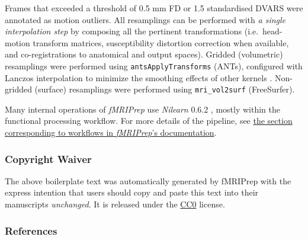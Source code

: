\documentclass[]{article}
\begin{document}
\begin{description}
Frames that exceeded a threshold of 0.5 mm FD or 1.5 standardised DVARS
were annotated as motion outliers. All resamplings can be performed with
\emph{a single interpolation step} by composing all the pertinent
transformations (i.e.~head-motion transform matrices, susceptibility
distortion correction when available, and co-registrations to anatomical
and output spaces). Gridded (volumetric) resamplings were performed
using \texttt{antsApplyTransforms} (ANTs), configured with Lanczos
interpolation to minimize the smoothing effects of other kernels
\citep{lanczos}. Non-gridded (surface) resamplings were performed using
\texttt{mri\_vol2surf} (FreeSurfer).
\end{description}

Many internal operations of \emph{fMRIPrep} use \emph{Nilearn} 0.6.2
\citep[RRID:SCR\_001362]{nilearn}, mostly within the functional
processing workflow. For more details of the pipeline, see
\href{https://fmriprep.readthedocs.io/en/latest/workflows.html}{the
section corresponding to workflows in \emph{fMRIPrep}'s documentation}.

\hypertarget{copyright-waiver}{%
\subsubsection{Copyright Waiver}\label{copyright-waiver}}

The above boilerplate text was automatically generated by fMRIPrep with
the express intention that users should copy and paste this text into
their manuscripts \emph{unchanged}. It is released under the
\href{https://creativecommons.org/publicdomain/zero/1.0/}{CC0} license.

\hypertarget{references}{%
\subsubsection{References}\label{references}}


\end{document}
